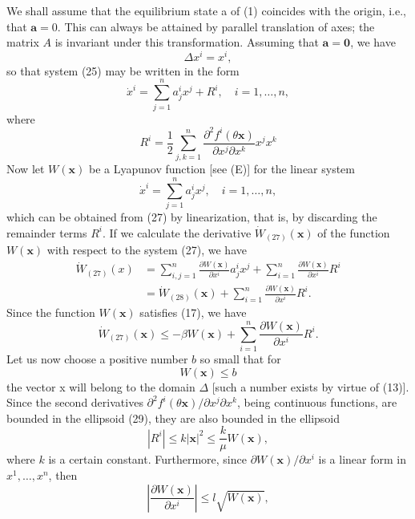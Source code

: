 \documentclass[10pt,a5paper]{book}
\makeatletter
\theoremstyle{plain}
\theoremstyle{definition}
\theoremstyle{remark}
\renewenvironment{proof}[1][\proofname]{\par
  \pushQED{\qed}%
  \normalfont\topsep6\p@\@plus6\p@\relax
  \trivlist
  \item\relax{\itshape #1\@addpunct{.}}\hspace\labelsep\ignorespaces
}{\popQED\endtrivlist\@endpefalse}
\makeatother
\begin{document}
\begin{proof}
We shall assume that the equilibrium state a of (1) coincides with the origin, i.e., that $\mathbf{a}=0$. This can always be attained by parallel translation of axes; the matrix $A$ is invariant under this transformation. Assuming that $\mathbf{a}=\mathbf{0}$, we have
\[
\Delta x^{i}=x^{i},
\]
so that system (25) may be written in the form
\begin{equation*}
\dot{x}^{i}=\sum_{j=1}^{n} a_{j}^{i} x^{j}+R^{i}, \quad i=1, \ldots, n, \tag{27}
\end{equation*}
where
\[
R^{i}=\frac{1}{2} \sum_{j, k=1}^{n} \frac{\partial^{2} f^{i}(\theta \mathbf{x})}{\partial x^{j} \partial x^{k}} x^{j} x^{k}
\]
Now let $W(\mathbf{x})$ be a Lyapunov function [see (E)] for the linear system
\begin{equation*}
\dot{x}^{i}=\sum_{j=1}^{n} a_{j}^{i} x^{j}, \quad i=1, \ldots, n, \tag{28}
\end{equation*}
which can be obtained from (27) by linearization, that is, by discarding the remainder terms $R^{i}$. If we calculate the derivative $\dot{W}_{(27)}(\mathbf{x})$ of the function $W(\mathbf{x})$ with respect to the system (27), we have
\[
\begin{aligned}
\dot{W}_{(27)}(x) & =\sum_{i, j=1}^{n} \frac{\partial W(\mathbf{x})}{\partial x^{i}} a_{j}^{i} x^{j}+\sum_{i=1}^{n} \frac{\partial W(\mathbf{x})}{\partial x^{i}} R^{i} \\
& =\dot{W}_{(28)}(\mathbf{x})+\sum_{i=1}^{n} \frac{\partial W(\mathbf{x})}{\partial x^{i}} R^{i} .
\end{aligned}
\]
Since the function $W(\mathbf{x})$ satisfies (17), we have
\[
\dot{W}_{(27)}(\mathbf{x}) \leq-\beta W(\mathbf{x})+\sum_{i=1}^{n} \frac{\partial W(\mathbf{x})}{\partial x^{i}} R^{i} .
\]
Let us now choose a positive number $b$ so small that for
\begin{equation*}
W(\mathbf{x}) \leq b \tag{29}
\end{equation*}
the vector x will belong to the domain $\Delta$ [such a number exists by virtue of (13)]. Since the second derivatives $\partial^{2} f^{i}(\theta \mathbf{x}) / \partial x^{j} \partial x^{k}$, being continuous functions, are bounded in the ellipsoid (29), they are also bounded in the ellipsoid
\[
\left|R^{i}\right| \leq k|\mathbf{x}|^{2} \leq \frac{k}{\mu} W(\mathbf{x}),
\]
where $k$ is a certain constant. Furthermore, since $\partial W(\mathbf{x}) / \partial x^{i}$ is a linear form in $x^{1}, \ldots, x^{n}$, then
\[
\left|\frac{\partial W(\mathbf{x})}{\partial x^{i}}\right| \leq l \sqrt{W(\mathbf{x})},
\]
\end{proof}
\end{document}
